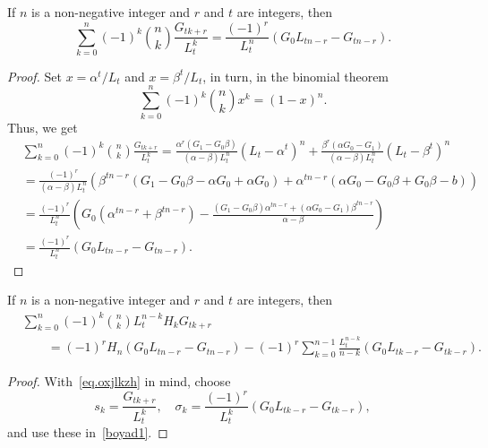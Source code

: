 \documentclass[12pt,reqno]{article}
\begin{document}
	\begin{lemma}
	If $n$ is a non-negative integer and $r$ and $t$ are integers, then
	\begin{equation}\label{eq.oxjlkzh}
	\sum_{k = 0}^n (- 1)^k \binom{{n}}{k}\frac{G_{tk + r}}{L_t^k} = \frac{( - 1)^r}{L_t^n}\left( G_0 L_{tn - r} - G_{tn - r} \right).
	\end{equation}
	\end{lemma}
	\begin{proof}
	Set $x=\alpha^t/L_t$ and $x=\beta^t/L_t$, in turn, in the binomial theorem
	\begin{equation*}
	\sum_{k = 0}^n ( - 1)^k \binom{{n}}{k}x^k = \left( {1 - x} \right)^n.
	\end{equation*}
	Thus, we get
	\begin{align*}
	&\sum_{k=0}^n (-1)^k \binom{n}{k}\frac{G_{tk+r}}{L_{t}^k} = \frac{\alpha^r(G_1-G_0\beta)}{(\alpha-\beta)L^n_t}\left(L_t-\alpha^t\right)^n+\frac{\beta^r(\alpha G_0-G_1)}{(\alpha-\beta)L^n_t}\left(L_t-\beta^t\right)^n \\
	&=\frac{(-1)^r}{(\alpha-\beta)L_t^n}\left(\beta^{tn-r}\left(G_1-G_0\beta-\alpha G_0+\alpha G_0\right)+\alpha^{tn-r}\left(\alpha G_0-G_0\beta+G_0\beta-b\right)\right) \\
	&=\frac{(-1)^r}{L_t^n}\left(G_0(\alpha^{tn-r}+\beta^{tn-r})-\frac{(G_1-G_0\beta)\alpha^{tn-r}+(\alpha G_0-G_1)\beta^{tn-r}}{\alpha-\beta}\right) \\
	&=\frac{{( - 1)^r }}{{L_t^n }}\left( {G_0 L_{tn - r} - G_{tn - r} } \right).
	\end{align*}
	\end{proof}
	
	\begin{theorem}
		If $n$ is a non-negative integer and $r$ and $t$ are integers, then
		\begin{align}
			&\sum_{k = 0}^n {( - 1)^k \binom{{n}}{k}L_t^{n - k} H_k G_{tk + r} }\nonumber\\
			&\qquad  = ( - 1)^r H_n \left( {G_0 L_{tn - r}  - G_{tn - r} } \right) - ( - 1)^r \sum_{k = 0}^{n - 1} {\frac{{L_t^{n - k} }}{{n - k}}\left( {G_0 L_{tk - r}  - G_{tk - r} } \right)} .
		\end{align}
	\end{theorem}
	\begin{proof}
		With~\eqref{eq.oxjlkzh} in mind, choose
		\begin{equation*}
			s_k  = \frac{{G_{tk + r} }}{{L_t^k }},\quad\sigma _k  = \frac{{( - 1)^r }}{{L_t^k }}\left(G_0L_{tk-r}-G_{tk-r}\right),
		\end{equation*}
		and use these in~\eqref{boyad1}.
	\end{proof}
	
\end{document}
